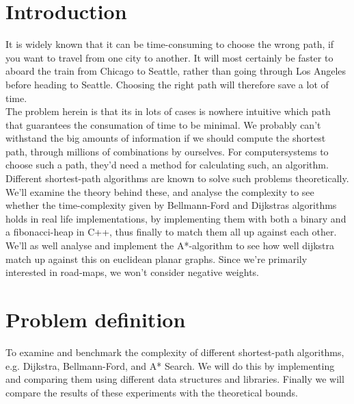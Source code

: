 \documentclass[11pt]{article}
\begin{document}
\section{Introduction}
It is widely known that it can be time-consuming to choose the wrong path, if you want to travel from one city to another. It will most certainly be faster to aboard the train from Chicago to Seattle, rather than going through Los Angeles before heading to Seattle. Choosing the right path will therefore save a lot of time.\\
The problem herein is that its in lots of cases is nowhere intuitive which path that guarantees the consumation of time to be minimal. We probably can't withstand the big amounts of information if we should compute the shortest path, through millions of combinations by ourselves. For computersystems to choose such a path, they'd need a method for calculating such, an algorithm.\\
Different shortest-path algorithms are known to solve such problems theoretically. We'll examine the theory behind these, and analyse the complexity to see whether the time-complexity given by Bellmann-Ford and Dijkstras algorithms holds in real life implementations, by implementing them with both a binary and a fibonacci-heap in C++, thus finally to match them all up against each other.\\
We'll as well analyse and implement the A*-algorithm to see how well dijkstra match up against this on euclidean planar graphs. Since we're primarily interested in road-maps, we won't consider negative weights.\\

\section{Problem definition}
To examine and benchmark the complexity of different shortest-path algorithms, e.g. Dijkstra, Bellmann-Ford, and A* Search. We will do this by implementing and comparing them using different data structures and libraries. Finally we will compare the results of these experiments with the theoretical bounds.
\end{document}
